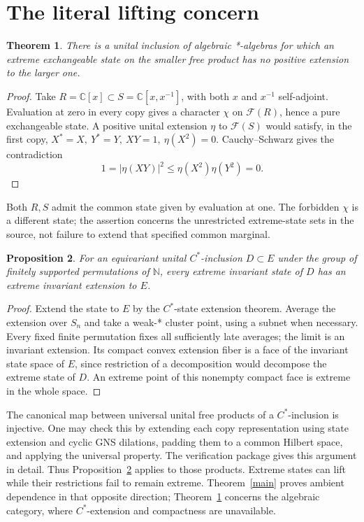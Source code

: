 \documentclass[10pt]{article}
\newtheorem{theorem}{Theorem}
\newtheorem{proposition}[theorem]{Proposition}
\newcommand{\C}{\mathbb C}
\newcommand{\F}{\mathcal F}
\begin{document}
\section{The literal lifting concern}
\begin{theorem}\label{nonlift}
There is a unital inclusion of algebraic *-algebras for which an
extreme exchangeable state on the smaller free product has no
positive extension to the larger one.
\end{theorem}
\begin{proof}
Take \(R=\C[x]\subset S=\C[x,x^{-1}]\), with both \(x\) and \(x^{-1}\)
self-adjoint. Evaluation at zero in every copy gives a character
\(\chi\) on \(\F(R)\), hence a pure exchangeable state.
A positive unital extension \(\eta\) to \(\F(S)\) would satisfy,
in the first copy, \(X^*=X,\ Y^*=Y,\ XY=1,\ \eta(X^2)=0\).
Cauchy--Schwarz gives the contradiction
\[
          1=|\eta(XY)|^2\le \eta(X^2)\eta(Y^2)=0.
\]
\end{proof}
Both \(R,S\) admit the common state given by evaluation at one.
The forbidden \(\chi\) is a different state; the assertion concerns
the unrestricted extreme-state sets in the source, not failure
to extend that specified common marginal.

\begin{proposition}\label{Clift}
For an equivariant unital \(C^*\)-inclusion \(D\subset E\) under the group
of finitely supported permutations of \(\mathbb N\), every extreme invariant
state of \(D\) has an extreme invariant extension to \(E\).
\end{proposition}
\begin{proof}
Extend the state to \(E\) by the \(C^*\)-state extension theorem.
Average the extension over \(S_n\) and take a weak-* cluster point,
using a subnet when necessary. Every fixed finite permutation
fixes all sufficiently late averages; the limit is an invariant
extension. Its compact convex extension fiber is a face of the
invariant state space of \(E\), since restriction of a decomposition
would decompose the extreme state of \(D\). An extreme point of
this nonempty compact face is extreme in the whole space.
\end{proof}
The canonical map between universal unital free products of a
\(C^*\)-inclusion is injective. One may check this by extending each
copy representation using state extension and cyclic GNS
dilations, padding them to a common Hilbert space, and applying
the universal property. The verification package gives this
argument in detail. Thus Proposition~\ref{Clift} applies to those
products. Extreme states can lift while their restrictions fail
to remain extreme. Theorem~\ref{main} proves ambient dependence
in that opposite direction; Theorem~\ref{nonlift} concerns the
algebraic category, where \(C^*\)-extension and compactness are unavailable.
\end{document}
